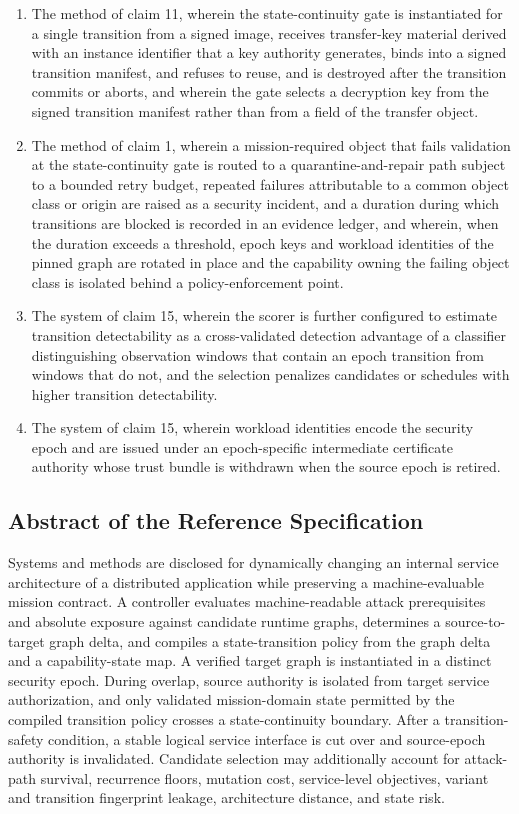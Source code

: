 \documentclass[11pt,letterpaper]{article}
\begin{document}
\begin{enumerate}[leftmargin=2em,itemsep=3pt,label=\arabic*.]
\item The method of claim 11, wherein the state-continuity gate is instantiated for a single transition from a signed image, receives transfer-key material derived with an instance identifier that a key authority generates, binds into a signed transition manifest, and refuses to reuse, and is destroyed after the transition commits or aborts, and wherein the gate selects a decryption key from the signed transition manifest rather than from a field of the transfer object.
\item The method of claim 1, wherein a mission-required object that fails validation at the state-continuity gate is routed to a quarantine-and-repair path subject to a bounded retry budget, repeated failures attributable to a common object class or origin are raised as a security incident, and a duration during which transitions are blocked is recorded in an evidence ledger, and wherein, when the duration exceeds a threshold, epoch keys and workload identities of the pinned graph are rotated in place and the capability owning the failing object class is isolated behind a policy-enforcement point.
\item The system of claim 15, wherein the scorer is further configured to estimate transition detectability as a cross-validated detection advantage of a classifier distinguishing observation windows that contain an epoch transition from windows that do not, and the selection penalizes candidates or schedules with higher transition detectability.
\item The system of claim 15, wherein workload identities encode the security epoch and are issued under an epoch-specific intermediate certificate authority whose trust bundle is withdrawn when the source epoch is retired.
\end{enumerate}

\subsection{Abstract of the Reference Specification}

Systems and methods are disclosed for dynamically changing an internal service architecture of a distributed application while preserving a machine-evaluable mission contract. A controller evaluates machine-readable attack prerequisites and absolute exposure against candidate runtime graphs, determines a source-to-target graph delta, and compiles a state-transition policy from the graph delta and a capability-state map. A verified target graph is instantiated in a distinct security epoch. During overlap, source authority is isolated from target service authorization, and only validated mission-domain state permitted by the compiled transition policy crosses a state-continuity boundary. After a transition-safety condition, a stable logical service interface is cut over and source-epoch authority is invalidated. Candidate selection may additionally account for attack-path survival, recurrence floors, mutation cost, service-level objectives, variant and transition fingerprint leakage, architecture distance, and state risk.
\end{document}
